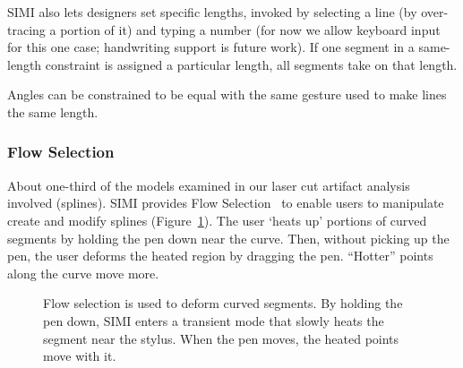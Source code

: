 \documentclass{article}
\begin{document}
SIMI also lets designers set specific lengths, invoked by selecting a
line (by over-tracing a portion of it) and typing a number (for now we
allow keyboard input for this one case; handwriting support is future
work). If one segment in a same-length constraint is assigned a
particular length, all segments take on that length.

Angles can be constrained to be equal with the same gesture used to
make lines the same length.

\subsubsection{Flow Selection}


About one-third of the models examined in our laser cut artifact
analysis involved (splines). SIMI provides Flow
Selection~\cite{johnson-flow-selection} to enable users to manipulate
create and modify splines (Figure~\ref{fig:fs}). The user `heats up'
portions of curved segments by holding the pen down near the
curve. Then, without picking up the pen, the user deforms the heated
region by dragging the pen. ``Hotter'' points along the curve move
more.

\begin{figure}[h]
\centering {}
\hspace{3mm} 
\caption{Flow selection is used to deform curved segments. By holding
  the pen down, SIMI enters a transient mode that slowly heats the
  segment near the stylus. When the pen moves, the heated points move
  with it.}
\label{fig:fs}
\end{figure}
\end{document}
